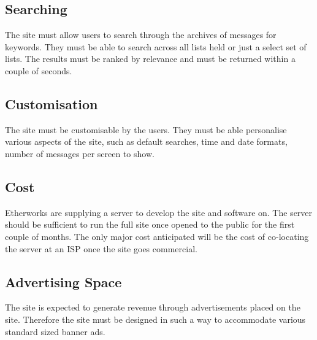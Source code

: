 \subsection*{Searching}
The site must allow users to search through the archives of messages
for keywords. They must be able to search across all lists held or
just a select set of lists.  The results must be ranked by relevance
and must be returned within a couple of seconds.

\subsection*{Customisation}
The site must be customisable by the users.  They must be able
personalise various aspects of the site, such as default searches,
time and date formats, number of messages per screen to show.

\subsection*{Cost}
Etherworks are supplying a server to develop the site and software
on.  The server should be sufficient to run the full site once opened
to the public for the first couple of months.  The only major cost
anticipated will be the cost of co-locating the server at an ISP once
the site goes commercial.

\subsection*{Advertising Space}
The site is expected to generate revenue through advertisements placed on the 
site.  Therefore the site must be designed in such a way to accommodate various standard sized banner ads.

